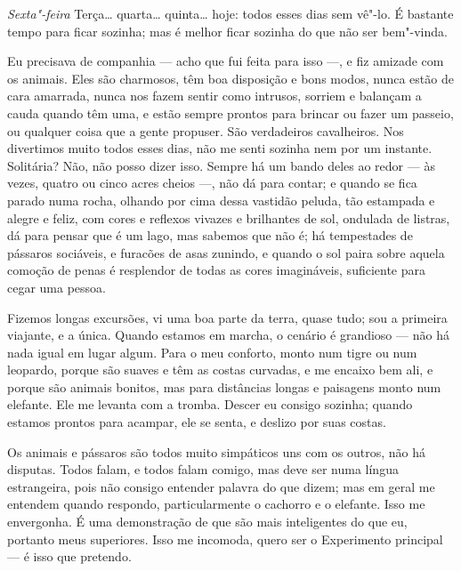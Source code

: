 \begin{center}
\leafNE
\end{center}


\textit{Sexta"-feira} Terça\ldots{} quarta\ldots{} quinta\ldots{} hoje: todos esses
dias sem vê"-lo. É bastante tempo para ficar sozinha; mas é melhor ficar sozinha
do que não ser bem"-vinda.

Eu precisava de companhia --- acho que fui feita para isso ---, e fiz 
amizade com os animais. Eles são charmosos, têm boa disposição e
bons modos, nunca estão de cara amarrada, nunca nos fazem sentir como
intrusos, sorriem e balançam a cauda quando têm uma, e estão sempre
prontos para brincar ou fazer um passeio, ou qualquer coisa que a gente
propuser. São verdadeiros cavalheiros. Nos divertimos muito todos esses dias, 
não me senti sozinha nem por um instante. Solitária? Não, não posso
dizer isso. Sempre há um bando deles ao redor --- às vezes, quatro ou
cinco acres cheios ---, não dá para contar; e quando se fica parado numa
rocha, olhando por cima dessa vastidão peluda, tão estampada e alegre e feliz,
com cores e reflexos vivazes e brilhantes de sol, ondulada de listras, dá para
pensar que é um lago, mas sabemos que não é; há tempestades de pássaros
sociáveis, e furacões de asas zunindo, e quando o sol paira sobre aquela
comoção de penas é resplendor de todas as cores imagináveis,
suficiente para cegar uma pessoa.

Fizemos longas excursões, vi uma boa parte da terra, quase tudo;
sou a primeira viajante, e a única. Quando estamos em marcha, o cenário
é grandioso --- não há nada igual em lugar algum. Para o meu conforto, monto
num tigre ou num leopardo, porque são suaves e têm as costas curvadas, e me
encaixo bem ali, e porque são animais bonitos, mas para distâncias longas e paisagens
monto num elefante. Ele me levanta com a tromba. Descer eu consigo
sozinha; quando estamos prontos para acampar, ele se senta, e deslizo por suas costas.

Os animais e pássaros são todos muito simpáticos uns com os outros, não há
disputas. Todos falam, e todos falam comigo, mas deve
ser numa língua estrangeira, pois não consigo entender palavra do
que dizem; mas em geral me entendem quando respondo, particularmente o
cachorro e o elefante. Isso me envergonha. É uma demonstração de que são mais
inteligentes do que eu, portanto meus superiores. Isso me incomoda, quero ser
o Experimento principal --- é isso que pretendo.

